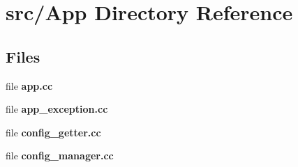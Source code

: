 \section{src/\+App Directory Reference}
\label{dir_951f43124f8a9985ab7802551d674f01}
\subsection*{Files}
\begin{DoxyCompactItemize}
\item 
file {\bfseries app.\+cc}
\item 
file {\bfseries app\+\_\+exception.\+cc}
\item 
file {\bfseries config\+\_\+getter.\+cc}
\item 
file {\bfseries config\+\_\+manager.\+cc}
\end{DoxyCompactItemize}
